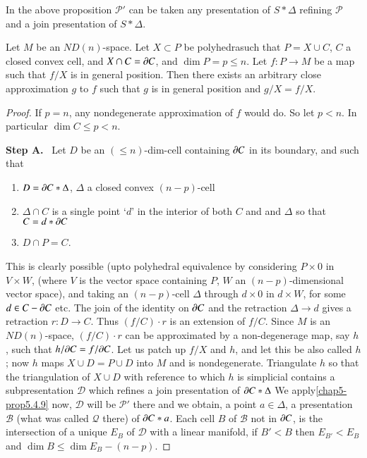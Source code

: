 \begin{remark*}
In the above proposition $\mathscr{P}'$ can be taken any presentation of $S\ast \Delta$ refining $\mathscr{P}$ and a join presentation of $S\ast\Delta$.
\end{remark*}

\begin{proposition}\label{chap5-prop5.4.10}
Let $M$ be an $ND(n)$-space. Let $X\subset P$ be polyhedra\pageoriginale such that $P=X\cup C$, $C$ a closed convex cell, and $X\cap C=\partial C$, and $\dim P=p\leq n$. Let $f:P\to M$ be a map such that $f/X$ is in general position. Then there exists an arbitrary close approximation $g$ to $f$ such that $g$ is in general position and $g/X=f/X$.
\end{proposition}

\begin{proof}
If $p=n$, any nondegenerate approximation of $f$ would do. So let $p<n$. In particular $\dim C\leq p<n$.

\smallskip
\noindent
{\bf Step A.}~ Let $D$ be an $(\leq n)$-dim-cell containing $\partial C$ in its boundary, and such that
\begin{enumerate}
\renewcommand{\labelenumi}{(\theenumi)}
\item $D=\partial C\ast \Delta$, $\Delta$ a closed convex $(n-p)$-cell

\item $\Delta \cap C$ is a single point `$d$' in the interior of both $C$ and and $\Delta$ so that $C=d\ast\partial C$ 

\item $D\cap P=C$.
\end{enumerate}

This is clearly possible (upto polyhedral equivalence by considering $P\times 0$ in $V\times W$, (where $V$ is the vector space containing $P$, $W$ an $(n-p)$-dimensional vector space), and taking an $(n-p)$-cell $\Delta$ through $d\times 0$ in $d\times W$, for some $d\in C-\partial C$ etc. The join of the identity on $\partial C$ and the retraction $\Delta \to d$ gives a retraction $r:D\to C$. Thus $(f/C)\cdot r$ is an extension of $f/C$. Since $M$ is an $ND(n)$-space, $(f/C)\cdot r$ can be approximated by a non-degenerage map, say $h$, such that $h/\partial C=f/\partial C$. Let us patch up $f/X$ and $h$, and let this be also called $h$; now $h$ maps $X\cup D=P\cup D$ into $M$ and is nondegenerate. Triangulate $h$ so that the triangulation of $X\cup D$ with reference to which $h$ is simplicial contains a subpresentation $\mathscr{D}$ which refines a join presentation of $\partial C\ast \Delta$ We apply\pageoriginale \ref{chap5-prop5.4.9} now, $\mathscr{D}$ will be $\mathscr{P}'$ there and we obtain, a point $a\in \Delta$, a presentation $\mathscr{B}$ (what was called $\mathcal{Q}$ there) of $\partial C\ast a$. Each cell $B$ of $\mathscr{B}$ not in $\partial C$, is the intersection of a unique $E_{B}$ of $\mathscr{D}$ with a linear manifold, if $B'<B$ then $E_{B'}<E_{B}$ and $\dim B\leq \dim E_{B}-(n-p)$. 


\end{proof}
